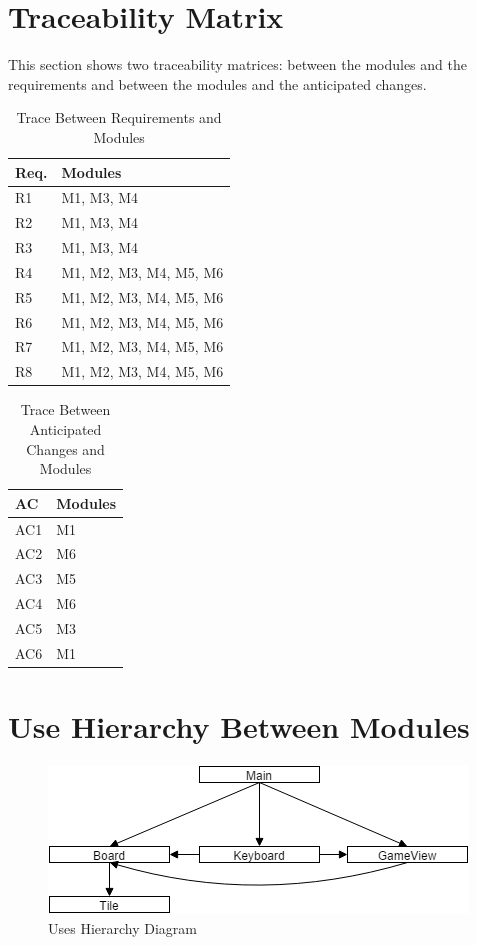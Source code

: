 \documentclass[12pt]{article}
\begin{document}
\section{Traceability Matrix}
This section shows two traceability matrices: between the modules and 
the 
requirements and between the modules and the anticipated changes. 
\smallskip
\begin{table}[!htbp]
	\centering
	\begin{tabular}{p{3cm}|p{9cm}}
		\textbf{Req.} & \textbf{Modules} \\\hline
		R1 & M1, M3, M4\\
		R2 & M1, M3, M4 \\
		R3 & M1, M3, M4 \\
		R4 & M1, M2, M3, M4, M5, M6 \\
		R5 & M1, M2, M3, M4, M5, M6\\
		R6 & M1, M2, M3, M4, M5, M6\\
		R7 & M1, M2, M3, M4, M5, M6\\
		R8 & M1, M2, M3, M4, M5, M6\\\hline
	\end{tabular}
	\caption{Trace Between Requirements and Modules}
	\label{Trace Between Requirements and Modules}
\end{table}
\begin{table}[!htbp]
	\centering
	\begin{tabular}{p{3cm}|p{9cm}}
		\textbf{AC} & \textbf{Modules} \\\hline
		AC1 & M1 \\ 
		AC2 &  M6\\  
		AC3 &  M5\\  
		AC4 &  M6\\ 
		AC5 & M3\\ 
		AC6 & M1\\ \hline
	\end{tabular}
	\caption{Trace Between Anticipated Changes and Modules}
	\label{Trace Between Anticipated Changes and Modules}
\end{table}
\newpage

\section{Use Hierarchy Between Modules}
\begin{figure}[!htbp]
	\includegraphics{uses}
	\centering
	\caption{Uses Hierarchy Diagram}
	\label{Uses Hierarchy Diagram}
\end{figure}
\end{document}
